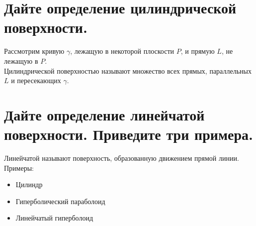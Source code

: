 \documentclass{article}
\begin{document}
\section{Дайте определение цилиндрической поверхности.}
Рассмотрим кривую $\gamma$, лежащую в некоторой плоскости $P$, и
прямую $L$, не лежащую в $P$. 
\\
Цилиндрической поверхностью называют множество
всех прямых, параллельных $L$ и пересекающих $\gamma$.

\section{Дайте определение линейчатой поверхности. Приведите три примера.}
Линейчатой называют поверхность, образованную
движением прямой линии.
\\
Примеры:
\begin{itemize}
    \item Цилиндр
    \item Гиперболический параболоид
    \item Линейчатый гиперболоид
\end{itemize}
\end{document}
